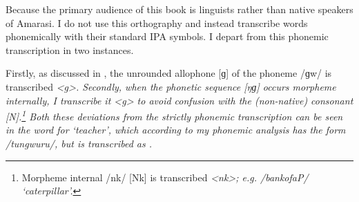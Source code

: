 Because the primary audience of this book is linguists
rather than native speakers of Amarasi.
I do not use this orthography and instead
transcribe words phonemically with their standard IPA symbols.
I depart from this phonemic transcription in two instances.

Firstly, as discussed in , the unrounded
allophone [ɡ] of the phoneme /ɡw/ is transcribed \it{<g>}.
Secondly, when the phonetic sequence [ŋɡ] occurs
morpheme internally, I transcribe it \it{<\ng g>} to avoid
confusion with the (non-native) consonant [N].\footnote{
		Morpheme internal /nk/ {\ra} [Nk] is transcribed \it{<nk>};
		e.g. /bankofaP/ {\ra}  `caterpillar'.}
Both these deviations from the strictly phonemic transcription
can be seen in the word for `teacher',
which according to my phonemic analysis has the form /tungwuru/,
but is transcribed as .
